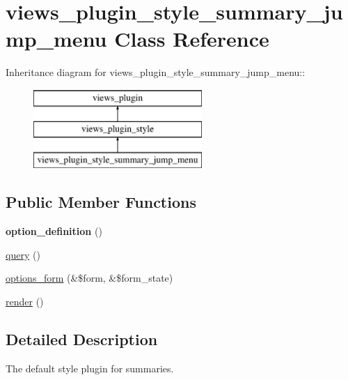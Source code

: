 \hypertarget{classviews__plugin__style__summary__jump__menu}{
\section{views\_\-plugin\_\-style\_\-summary\_\-jump\_\-menu Class Reference}
\label{classviews__plugin__style__summary__jump__menu}
}
Inheritance diagram for views\_\-plugin\_\-style\_\-summary\_\-jump\_\-menu::\begin{figure}[H]
\begin{center}
\leavevmode
\includegraphics[height=3cm]{classviews__plugin__style__summary__jump__menu}
\end{center}
\end{figure}
\subsection*{Public Member Functions}
\begin{DoxyCompactItemize}
\item 
\hypertarget{classviews__plugin__style__summary__jump__menu_af8b62f282687c9670850c990c376f2c4}{
{\bfseries option\_\-definition} ()}
\label{classviews__plugin__style__summary__jump__menu_af8b62f282687c9670850c990c376f2c4}

\item 
\hyperlink{classviews__plugin__style__summary__jump__menu_aee2a45ee02a7ce8d041a5b028758cf0b}{query} ()
\item 
\hyperlink{classviews__plugin__style__summary__jump__menu_ab66730cfcd70ef23a0dbc05e80ad3d32}{options\_\-form} (\&\$form, \&\$form\_\-state)
\item 
\hyperlink{classviews__plugin__style__summary__jump__menu_a7e9b8b44735067dc7ebb838e54a21a38}{render} ()
\end{DoxyCompactItemize}


\subsection{Detailed Description}
The default style plugin for summaries. 

